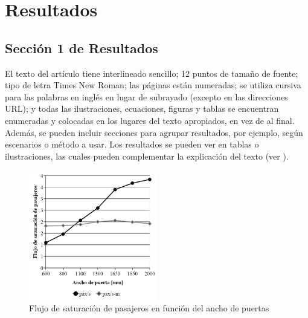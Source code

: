 \section{Resultados}
\label{sec:4}

\subsection{Sección 1 de Resultados}
\label{sec:4.1}

El texto del artículo tiene interlineado sencillo; 12 puntos de tamaño de fuente; tipo de letra Times New Roman; las páginas están numeradas; se utiliza cursiva para las palabras en inglés en lugar de subrayado (excepto en las direcciones URL); y todas las ilustraciones, ecuaciones, figuras y tablas se encuentran enumeradas y colocadas en los lugares del texto apropiados, en vez de al final.
Además, se pueden incluir secciones para agrupar resultados, por ejemplo, según escenarios o método a usar.
Los resultados se pueden ver en tablas o ilustraciones, las cuales pueden complementar la explicación del texto (ver ).

\begin{figure}[h]
    \centering
    \includegraphics[width=0.5\textwidth]{imagenes/fig1.png}
    \caption{Flujo de saturación de pasajeros en función del ancho de puertas}\label{fig1}
\end{figure}
